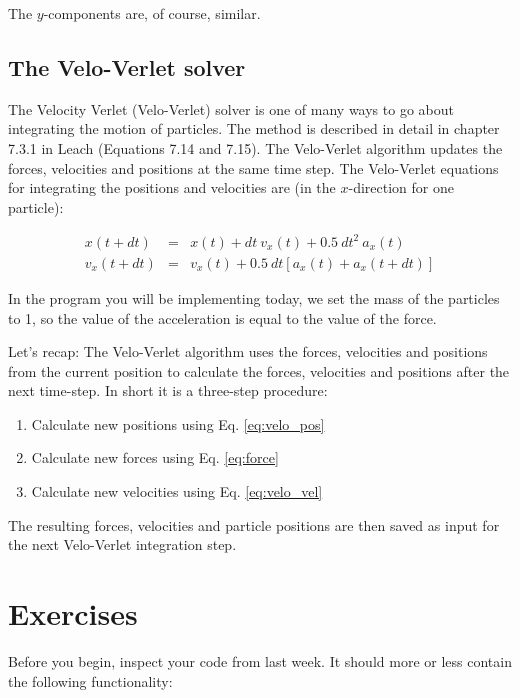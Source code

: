 \documentclass{article}
\begin{document}
The $y$-components are, of course, similar.

\subsection{The Velo-Verlet solver}

The Velocity Verlet (Velo-Verlet) solver is one of many ways to go about
integrating the motion of particles. The method is described in detail in
chapter 7.3.1 in Leach (Equations 7.14 and 7.15). The Velo-Verlet algorithm
updates the forces, velocities and positions at the same time step. The
Velo-Verlet equations for integrating the positions and velocities are (in the
$x$-direction for one particle):

\begin{eqnarray}
x(t + dt) &=& x(t) + dt\ v_x(t) + 0.5\ dt^2\ a_x(t)\\
v_x(t + dt) &=& v_x(t) + 0.5\ dt \left[a_x(t) + a_x(t+dt)\right] \label{eq:velo_vel}
\end{eqnarray}

In the program you will be implementing today, we set the mass of the particles
to 1, so the value of the acceleration is equal to the value of the
force.

Let's recap: The Velo-Verlet algorithm uses the forces,
velocities and positions from the current position to calculate the forces,
velocities and positions after the next time-step. In short it is a three-step
procedure:

\begin{enumerate}
    \item Calculate new positions using Eq. \ref{eq:velo_pos}
    \item Calculate new forces using Eq. \ref{eq:force}
    \item Calculate new velocities using Eq. \ref{eq:velo_vel}
\end{enumerate}

The resulting forces, velocities and particle positions are then saved as input
for the next Velo-Verlet integration step.


\newpage
\clearpage
\section{Exercises}

Before you begin, inspect your code from last week. It should more or less
contain the following functionality:

\end{document}
